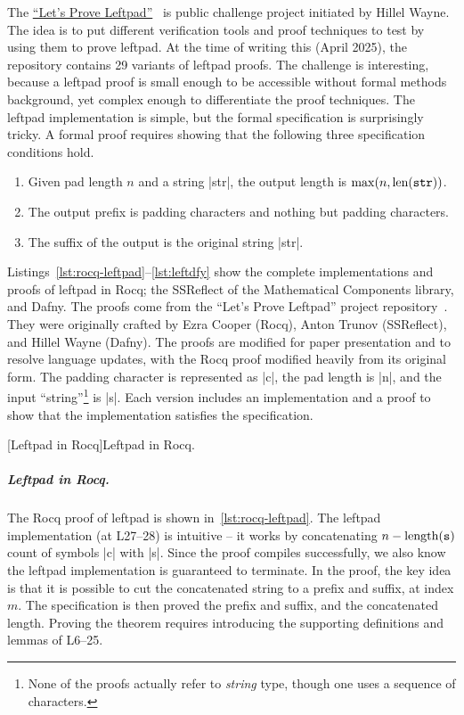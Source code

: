 The \href{https://github.com/hwayne/lets-prove-leftpad}{\enquote{Let's Prove Leftpad}}~\cite{leftpad} is public challenge project initiated by Hillel Wayne.
The idea is to put different verification tools and proof techniques to test by using them to prove leftpad.
At the time of writing this (April 2025), the repository contains 29 variants of leftpad proofs.
The challenge is interesting, because a leftpad proof is small enough to be accessible without formal methods background, yet complex enough to differentiate the proof techniques.
The leftpad implementation is simple, but the formal specification is surprisingly tricky.
A formal proof requires showing that the following three specification conditions hold.

\begin{enumerate}
\item Given pad length \(n\) and a string \pr|str|, the output length is \(\max(n, \text{len}(\prm{str}))\).
\item The output prefix is padding characters and nothing but padding characters.
\item The suffix of the output is the original string \pr|str|.
\end{enumerate}

Listings~\autoref{lst:rocq-leftpad}--\ref{lst:leftdfy} show the complete implementations and proofs of leftpad in Rocq;
the SSReflect of the Mathematical Components library, and Dafny.
The proofs come from the \enquote{Let's Prove Leftpad} project repository~\cite{leftpad}.
They were originally crafted by Ezra Cooper (Rocq), Anton Trunov (SSReflect), and Hillel Wayne (Dafny).
The proofs are modified for paper presentation and to resolve language updates, with the Rocq proof modified heavily from its original form.
The padding character is represented as \pr|c|, the pad length is \pr|n|, and the input \enquote{string}\footnote{
    None of the proofs actually refer to \emph{string} type, though one uses a sequence of characters.} is \pr|s|.
Each version includes an implementation and a proof to show that the implementation satisfies the specification.

\begin{center}
\captionsetup{type=lstlisting}
[Leftpad in Rocq]{Leftpad in Rocq.}
\label{lst:rocq-leftpad}
\end{center}

\subparagraph*{Leftpad in Rocq.}
The Rocq proof of leftpad is shown in~\autoref{lst:rocq-leftpad}.
The leftpad implementation (at L27--28) is intuitive --
it works by concatenating \(n - \text{length}(\prm{s})\) count of  symbols \pr|c| with \pr|s|.
Since the proof compiles successfully, we also know the leftpad implementation is guaranteed to terminate.
In the proof, the key idea is that it is possible to cut the concatenated string to a prefix and suffix, at index \(m\).
The specification is then proved \wrt the prefix and suffix, and the concatenated length.
Proving the theorem requires introducing the supporting definitions and lemmas of L6--25.

